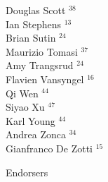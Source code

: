 \documentclass[PICOReport.tex]{subfiles}
\begin{document}
{\begin{multicols}{4}
Douglas Scott $^{38}$                   \\
Ian Stephens $^{13}$                    \\
Brian Sutin $^{24}$                     \\
Maurizio Tomasi $^{37}$                 \\
Amy Trangsrud $^{24}$                   \\
Flavien Vansyngel $^{16}$               \\
Qi Wen $^{44}$                          \\
Siyao Xu $^{47}$                        \\
Karl Young $^{44}$                      \\
Andrea Zonca $^{34}$                    \\
Gianfranco De Zotti $^{15}$             
\end{multicols}
}

\Large { \centerline {Endorsers}}
\end{document}
